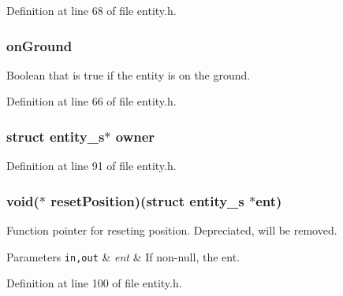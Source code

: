 Definition at line 68 of file entity.\+h.

\hypertarget{structentity__s_afcbf95c3f0a20a7d68c5d9a241853c66}{}
\subsubsection[{on\+Ground}]{ on\+Ground}\label{structentity__s_afcbf95c3f0a20a7d68c5d9a241853c66}


Boolean that is true if the entity is on the ground. 



Definition at line 66 of file entity.\+h.

\hypertarget{structentity__s_ab185065de2325558e780597d0e51230f}{}
\subsubsection[{owner}]{\setlength{\rightskip}{0pt plus 5cm}struct {\bf entity\+\_\+s}$\ast$ owner}\label{structentity__s_ab185065de2325558e780597d0e51230f}


Definition at line 91 of file entity.\+h.

\hypertarget{structentity__s_a92ed3b86c791f2114d9a1147443e7fe5}{}
\subsubsection[{reset\+Position}]{\setlength{\rightskip}{0pt plus 5cm}void($\ast$ reset\+Position)(struct {\bf entity\+\_\+s} $\ast$ent)}\label{structentity__s_a92ed3b86c791f2114d9a1147443e7fe5}


Function pointer for reseting position. Depreciated, will be removed. 


\begin{DoxyParams}[1]{Parameters}
\mbox{\tt in,out}  & {\em ent} & If non-\/null, the ent. \\
\hline
\end{DoxyParams}


Definition at line 100 of file entity.\+h.

\hypertarget{structentity__s_af4dbc59d08fcac46ed1ea8abadef6cb4}{}
